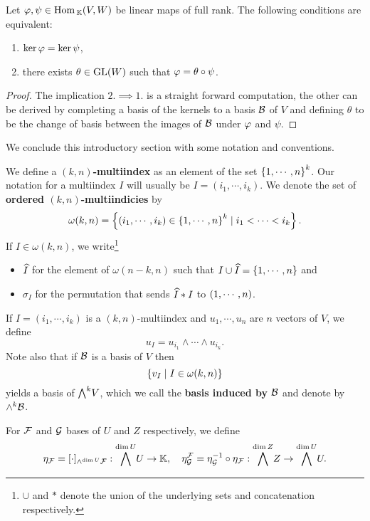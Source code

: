 \begin{lemma}\label{kerAkerBVSActionOfGLk}
Let $\varphi,\psi\in \mathrm{Hom}\,_{\mathbb{K}}(V,W)$ be linear maps of full rank. The following conditions are equivalent:
\begin{enumerate}
    \item $\ker\varphi=\ker\psi$,
    \item there exists $\theta\in \mathrm{GL}(W)$ such that $\varphi=\theta\circ \psi$. 
\end{enumerate}
\end{lemma}
\begin{proof}
The implication $2.\implies 1.$ is a straight forward computation, the other can be derived by completing a basis of the kernels to a basis $\mathcal{B}$ of $V$ and defining $\theta$ to be the change of basis between the images of $\mathcal{B}$ under $\varphi$ and $\psi$.
\end{proof}

\noindent We conclude this introductory section with some notation and conventions.
\begin{definition}[Multiindicies]
We define a \textbf{$(k,n)$-multiindex} as an element of the set $\left\{{1,\cdots, n}\right\}^k$. Our notation for a multiindex $I$ will usually be $I=(i_1,\cdots, i_k)$. 
We denote the set of \textbf{ordered $(k,n)$-multiindicies} by
\[\omega(k,n)=\left\{{(i_1,\cdots, i_k)\in \left\{{1,\cdots, n}\right\}^k\mid i_1<\cdots<i_k}\right\}.\]
If $I\in \omega(k,n)$, we write\footnote{$\cup$ and $\ast$ denote the union of the underlying sets and concatenation respectively.}
\begin{itemize}
\item $\widehat{I}$ for the element of $\omega(n-k,n)$ such that $I\cup \widehat{I}=\left\{{1,\cdots, n}\right\}$ and 
\item $\sigma_I$ for the permutation that sends $\widehat{I}\ast I$ to $\left({1,\cdots, n}\right)$.
\end{itemize}
\end{definition}

\begin{remark}
If $I=(i_1,\cdots, i_k)$ is a $(k,n)$-multiindex and $u_1,\cdots, u_n$ are $n$ vectors of $V$, we define
\[u_I=u_{i_1}\wedge\cdots\wedge u_{i_k}.\]
Note also that if $\mathcal{B}$ is a basis of $V$ then
\[\left\{{v_I\mid I\in \omega(k,n)}\right\}\]
yields a basis of $\bw V$, which we call the \textbf{basis induced by $\mathcal{B}$} and denote by $\wedge^k\mathcal{B}$.
\end{remark}

\begin{notation}
For $\mathcal{F}$ and $\mathcal{G}$ bases of $U$ and $Z$ respectively, we define
\[\eta_\Fc=[\cdot]_{\wedge^{\dim U}\Fc}:\bw[\dim U]U\to \K,\quad \eta^\Fc_\Gc=\eta_\Gc\ii\circ \eta_\Fc:\bw[\dim Z]Z\to\bw[\dim U]U.\]
\end{notation}



